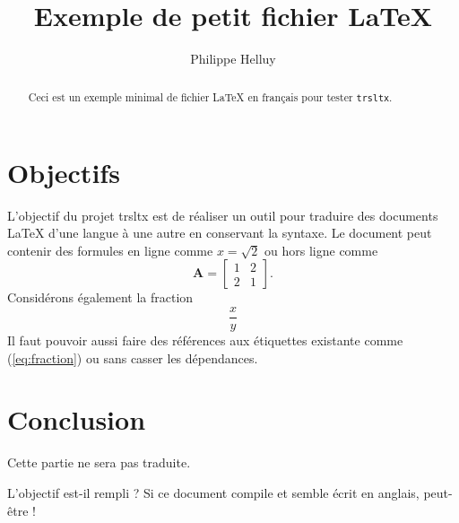 
\title{Exemple de petit fichier \LaTeX}
\author{Philippe Helluy}
\maketitle
\begin{abstract}
Ceci est un exemple minimal de fichier \LaTeX{} en français pour tester
\texttt{trsltx}.
\end{abstract}

\section{Objectifs}

L'objectif du projet trsltx est de réaliser un outil pour traduire
des documents \LaTeX{}
d'une langue à une autre en conservant {} la syntaxe.
Le document peut contenir des formules en ligne comme $x=\sqrt{2}$
ou hors ligne comme
\begin{equation}
\mathbf{A}=\left[\begin{array}{cc}
1 & 2\\
2 & 1
\end{array}\right].\label{eq:matrice}
\end{equation}
Considérons également la fraction
\begin{equation}
\frac{x}{y} \label{eq:fraction}
\end{equation}
Il faut pouvoir aussi faire des références aux étiquettes existante
comme (\ref{eq:fraction}) ou  sans casser les dépendances.

\section{Conclusion}

Cette partie ne 
sera pas traduite.

L'objectif est-il rempli ? Si ce document compile et semble écrit
en anglais, peut-être !
